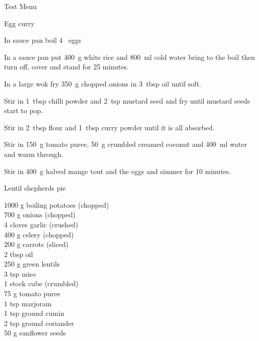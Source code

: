 \begin{menu}{Test Menu}
\begin{recipe}{2}{Egg curry}
    \begin{instructions}
    \item 
        In sauce pan boil
        4~  eggs\item 
      In a
      sauce pan
      put
      400~g  white rice
      and
      800~ml  cold water
      bring to the boil then turn off, cover and stand for 25 minutes.
    \item 
        In a large wok fry
        350~g chopped onions
        in
        3~tbsp  oil
        until soft.
      \item 
        Stir in 1~tbsp  chilli powder
        and
        2~tsp  mustard seed
        and fry until mustard seeds start to pop.
      \item 
        Stir in
        2~tbsp  flour
        and
        1~tbsp  curry powder
        until it is all absorbed.
      \item 
        Stir in
        150~g  tomato puree,
        50~g crumbled creamed coconut
        and
        400~ml  water
        and warm through.
      \item 
        Stir in
        400~g halved mange tout
        and the eggs
        and simmer for 10 minutes.
      
    \end{instructions}
    \end{recipe}%
  
    \begin{recipe}{2}{Lentil shepherds pie}%
    
		\begin{ingredients}
		1000 g boiling potatoes (chopped) \\
	700 g onions (chopped) \\
	4 cloves garlic (crushed) \\
	400 g celery (chopped) \\
	200 g carrots (sliced) \\
	2 tbsp oil  \\
	250 g green lentils  \\
	3 tsp miso  \\
	1  stock cube (crumbled) \\
	75 g tomato puree  \\
	1 tsp marjoram  \\
	1 tsp ground cumin  \\
	2 tsp ground coriander  \\
	50 g sunflower seeds  \\
	
		\end{ingredients}
	

\end{recipe}
\end{menu}
